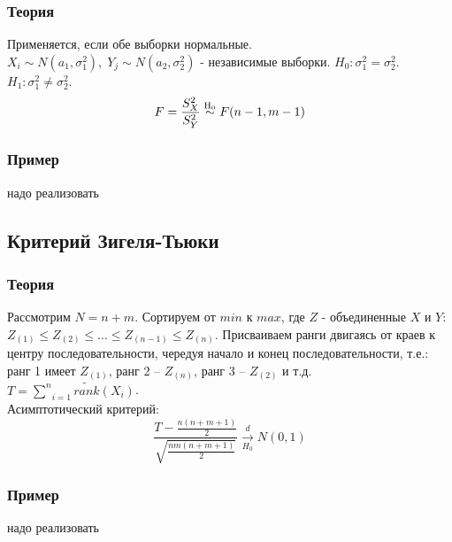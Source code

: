	\subsubsection*{Теория}\label{cha:2sample/sec:var/subsec:ftest/subsubsec:theory}

	Применяется, если обе выборки нормальные.\\

	$X_i \sim N(a_1, \sigma_1^2), \; Y_j \sim N(a_2, \sigma_2^2)$ - независимые выборки. $H_0: \sigma_1^2 = \sigma_2^2$. $H_1: \sigma_1^2 \not = \sigma_2^2$.
	$$F = \frac{S_X^2}{S_Y^2} \mathrel{\stackrel{\rm H_0}\sim} F (n-1, m-1)$$

	\subsubsection*{Пример}\label{cha:2sample/sec:var/subsec:ftest/subsubsec:prob}

	надо реализовать

\subsection{Критерий Зигеля-Тьюки}\label{cha:2sample/sec:var/subsec:siegel}

	\subsubsection*{Теория}\label{cha:2sample/sec:var/subsec:siegel/subsubsec:theory}

	Рассмотрим $N = n+m$. Сортируем от $min$ к $max$, где $Z$ - объединенные $X$ и $Y$: $Z_{(1)} \le Z_{(2)} \le \dots \le Z_{(n-1)} \le Z_{(n)}$. Присваиваем ранги двигаясь от краев к центру последовательности, чередуя начало и конец последовательности, т.е.: ранг 1 имеет $Z_{(1)}$, ранг 2 -- $Z_{(n)}$, ранг 3 -- $Z_{(2)}$ и т.д.\\
	$T = \underset{i=1}{\overset{n}{\sum}}\tilde{rank} (X_i)$.\\

	Асимптотический критерий:
	$$\frac{T - \frac{n (n+m+1)}{2}}{\sqrt{\frac{n m (n+m+1)}{2}}} \xrightarrow[H_0]{d} N(0,1)$$

	\subsubsection*{Пример}\label{cha:2sample/sec:var/subsec:siegel/subsubsec:prob}

	надо реализовать



























